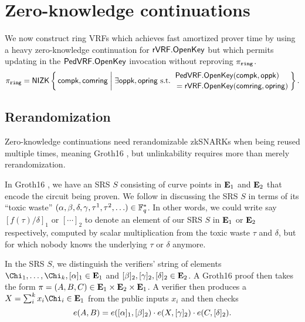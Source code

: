 
\section{Zero-knowledge continuations}
\label{sec:rvrf_cont}

\newcommand\rrSNARK{\primalgo{Groth16}\xspace}
\newcommand\rrSNARKweak{\primalgo{Groth16/KZG}\xspace}
\newcommand\pifast{\ensuremath{\pi_{\mathtt{fast}}}\xspace}
\newcommand\pisk{\ensuremath{\pi_{\mathtt{sk}}}\xspace}
\newcommand\pipk{\ensuremath{\dot{\pi}_{\mathtt{pk}}}\xspace}


We now construct ring VRFs which achieves fast amortized prover time
by using a heavy zero-knowledge continuation for ${\mathsf{rVRF}}.{\mathsf{OpenKey}}$ but
which permits updating \openpk in the ${\mathsf{PedVRF}}.{\mathsf{OpenKey}}$ invocation
without reproving $\pi_{\mathtt{ring}}$.
$$ \piring = \NIZK \Setst{ \compk, \comring }{
 \exists \openpk,\openring \textrm{\ s.t.\ } 
 \genfrac{}{}{0pt}{}{\PedVRF.\OpenKey(\compk,\openpk) \quad}{\,\, = \rVRF.\OpenKey(\comring,\openring)}
} \mathperiod $$

\subsection{Rerandomization}

Zero-knowledge continuations need rerandomizable zkSNARKs
when being reused multiple times, meaning Groth16 \cite{Groth16},
but unlinkability requires more than merely rerandomization.

In Groth16 \cite{Groth16}, we have an SRS $S$ consisting of curve
points in ${\mathbf{E}}_1$ and ${\mathbf{E}}_2$ that encode the circuit being proven.
We follow \cite{Groth16} in discussing the SRS $S$ in terms of
its ``toxic waste''
 $(\alpha,\beta,\delta,\gamma,\tau^1,\tau^2,\ldots) \in \mathbb{F}_q^*$.
In other words, we could write say $[ f(\tau)/\delta ]_1$ or $[\cdots]_2$
to denote an element of our SRS $S$ in ${\mathbf{E}}_1$ or ${\mathbf{E}}_2$ respectively,
computed by scalar multiplication from the toxic waste $\tau$ and $\delta$,
 but for which nobody knows the underlying $\tau$ or $\delta$ anymore.

In the SRS $S$, we distinguish the verifiers' string of elements
 $\Chi_1,\ldots,\Chi_k, [\alpha]_1 \in \grE_1$ and
 $[\beta]_2, [\gamma]_2, [\delta]_2 \in {\mathbf{E}}_2$.
A Groth16 \cite{Groth16} proof then takes the form 
 $\pi = (A,B,C) \in {\mathbf{E}}_1 \times {\mathbf{E}}_2 \times {\mathbf{E}}_1$.
A verifier then produces a $X = \sum_i^k x_i \Chi_i \in \grE_1$ from
 the public inputs $x_i$ and then checks 
$$ e(A,B) = e([\alpha]_1, [\beta]_2) \cdot
 e(X, [\gamma]_2) \cdot e(C, [\delta]_2) . $$

